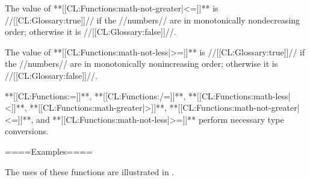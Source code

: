 \itemitem{**[[CL:Functions:math-not-greater|<=]]**}

The value of **[[CL:Functions:math-not-greater|<=]]** is //[[CL:Glossary:true]]// if the //numbers// are in monotonically nondecreasing order; otherwise it is //[[CL:Glossary:false]]//.

\itemitem{**[[CL:Functions:math-not-less|>=]]**}

The value of **[[CL:Functions:math-not-less|>=]]** is //[[CL:Glossary:true]]// if the //numbers// are in monotonically nonincreasing order; otherwise it is //[[CL:Glossary:false]]//. \endlist

**[[CL:Functions:=]]**, **[[CL:Functions:/=]]**, **[[CL:Functions:math-less|<]]**, **[[CL:Functions:math-greater|>]]**, **[[CL:Functions:math-not-greater|<=]]**, and **[[CL:Functions:math-not-less|>=]]** perform necessary type conversions.

====Examples====

The uses of these functions are illustrated in \thenextfigure.

